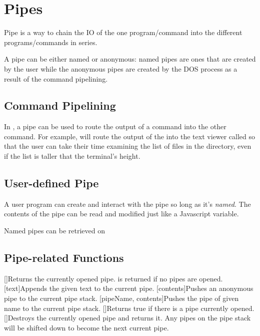 \chapter{Pipes}

Pipe is a way to chain the IO of the one program/command into the different programs/commands in series.

A pipe can be either named or anonymous: named pipes are ones that are created by the user while the anonymous pipes are created by the DOS process as a result of the command pipelining.

\section{Command Pipelining}

In \thedos, a pipe can be used to route the output of a command into the other command. For example,  will route the output of the  into the text viewer called  so that the user can take their time examining the list of files in the directory, even if the list is taller that the terminal's height.

\section{User-defined Pipe}

A user program can create and interact with the pipe so long as it's \emph{named}. The contents of the pipe can be read and modified just like a Javascript variable.

Named pipes can be retrieved on 

\section{Pipe-related Functions}

\begin{outline}
\1[]{Returns the currently opened pipe.  is returned if no pipes are opened.}
\1[text]{Appends the given text to the current pipe.}
\1[contents]{Pushes an anonymous pipe to the current pipe stack.}
\1[pipeName, contents]{Pushes the pipe of given name to the current pipe stack.}
\1[]{Returns true if there is a pipe currently opened.}
\1[]{Destroys the currently opened pipe and returns it. Any pipes on the pipe stack will be shifted down to become the next current pipe.}
\end{outline}


